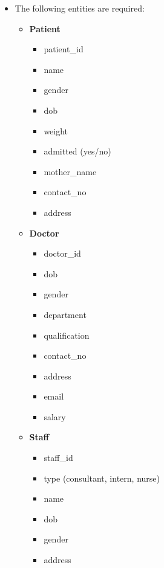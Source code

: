 \documentclass{article}
\begin{document}
\begin{itemize}
    \item The following entities are required:
        \begin{itemize}
            \item \textbf{Patient}
                \begin{itemize}
                    \item {\color{blue}patient\_id}
                    \item name
                    \item gender
                    \item dob
                    \item weight
                    \item admitted (yes/no)
                    \item mother\_name
                    \item contact\_no
                    \item address
                \end{itemize}
            \item \textbf{Doctor}
                \begin{itemize}
                    \item {\color{blue}doctor\_id}
                    \item dob
                    \item gender
                    \item department
                    \item qualification
                    \item contact\_no
                    \item address
                    \item email
                    \item salary
                \end{itemize}
            \item \textbf{Staff}
                \begin{itemize}
                    \item {\color{blue}staff\_id}
                    \item type (consultant, intern, nurse)
                    \item name
                    \item dob
                    \item gender
                    \item address

\end{itemize}
\end{itemize}
\end{itemize}
\end{document}
